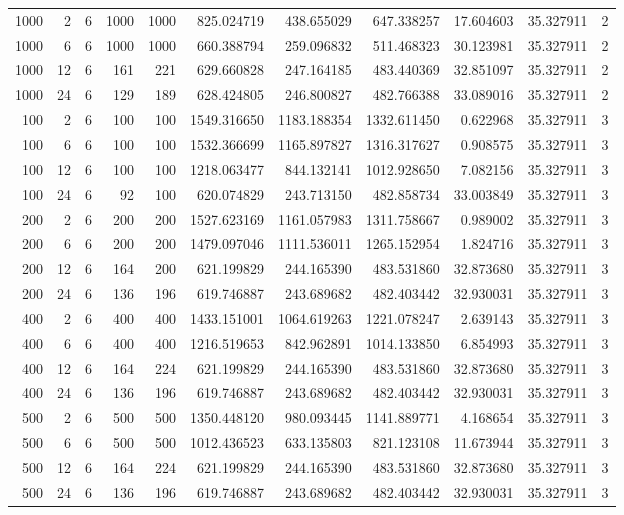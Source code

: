 \begin{table}
\begin{tabular}{rrrrrrrrrrr}
1000 & 2 & 6 & 1000 & 1000 & 825.024719 & 438.655029 & 647.338257 & 17.604603 & 35.327911 & 2 \\
1000 & 6 & 6 & 1000 & 1000 & 660.388794 & 259.096832 & 511.468323 & 30.123981 & 35.327911 & 2 \\
1000 & 12 & 6 & 161 & 221 & 629.660828 & 247.164185 & 483.440369 & 32.851097 & 35.327911 & 2 \\
1000 & 24 & 6 & 129 & 189 & 628.424805 & 246.800827 & 482.766388 & 33.089016 & 35.327911 & 2 \\
100 & 2 & 6 & 100 & 100 & 1549.316650 & 1183.188354 & 1332.611450 & 0.622968 & 35.327911 & 3 \\
100 & 6 & 6 & 100 & 100 & 1532.366699 & 1165.897827 & 1316.317627 & 0.908575 & 35.327911 & 3 \\
100 & 12 & 6 & 100 & 100 & 1218.063477 & 844.132141 & 1012.928650 & 7.082156 & 35.327911 & 3 \\
100 & 24 & 6 & 92 & 100 & 620.074829 & 243.713150 & 482.858734 & 33.003849 & 35.327911 & 3 \\
200 & 2 & 6 & 200 & 200 & 1527.623169 & 1161.057983 & 1311.758667 & 0.989002 & 35.327911 & 3 \\
200 & 6 & 6 & 200 & 200 & 1479.097046 & 1111.536011 & 1265.152954 & 1.824716 & 35.327911 & 3 \\
200 & 12 & 6 & 164 & 200 & 621.199829 & 244.165390 & 483.531860 & 32.873680 & 35.327911 & 3 \\
200 & 24 & 6 & 136 & 196 & 619.746887 & 243.689682 & 482.403442 & 32.930031 & 35.327911 & 3 \\
400 & 2 & 6 & 400 & 400 & 1433.151001 & 1064.619263 & 1221.078247 & 2.639143 & 35.327911 & 3 \\
400 & 6 & 6 & 400 & 400 & 1216.519653 & 842.962891 & 1014.133850 & 6.854993 & 35.327911 & 3 \\
400 & 12 & 6 & 164 & 224 & 621.199829 & 244.165390 & 483.531860 & 32.873680 & 35.327911 & 3 \\
400 & 24 & 6 & 136 & 196 & 619.746887 & 243.689682 & 482.403442 & 32.930031 & 35.327911 & 3 \\
500 & 2 & 6 & 500 & 500 & 1350.448120 & 980.093445 & 1141.889771 & 4.168654 & 35.327911 & 3 \\
500 & 6 & 6 & 500 & 500 & 1012.436523 & 633.135803 & 821.123108 & 11.673944 & 35.327911 & 3 \\
500 & 12 & 6 & 164 & 224 & 621.199829 & 244.165390 & 483.531860 & 32.873680 & 35.327911 & 3 \\
500 & 24 & 6 & 136 & 196 & 619.746887 & 243.689682 & 482.403442 & 32.930031 & 35.327911 & 3 \\

\end{tabular}
\end{table}
